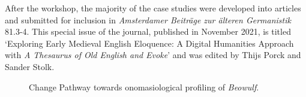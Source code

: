 After the workshop, the majority of the case studies were developed into articles and submitted for inclusion in \textit{Amsterdamer Beiträge zur älteren Germanistik} 81.3-4. This special issue of the journal, published in November 2021, is titled `Exploring Early Medieval English Eloquence: A Digital Humanities Approach with \textit{A Thesaurus of Old English and Evoke}' and was edited by Thijs Porck and Sander Stolk.

\begin{figure}[h!]
\centering
\noindent{}
\caption{\label{fig:app:8.B:w1-change}Change Pathway towards onomasiological profiling of \textit{Beowulf}.}
\end{figure}


